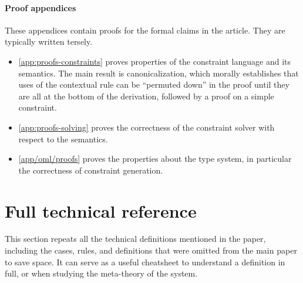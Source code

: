 \documentclass[acmsmall,screen,nonacm%
\Anonymous{,anonymous}{}%
\Final{}{,review}%
]{acmart}
\begin{document}
\paragraph{Proof appendices} These appendices contain proofs for the
formal claims in the article. They are typically written tersely.
\begin{itemize}
\item \cref{app:proofs-constraints} proves properties of the
  constraint language and its semantics. The main result is
  canonicalization, which morally establishes that uses of the
  contextual rule  can be ``permuted down'' in the
  proof until they are all at the bottom of the derivation, followed
  by a proof on a simple constraint.
\item \cref{app:proofs-solving} proves the correctness of the
  constraint solver with respect to the semantics.
\item \cref{app/oml/proofs} proves the properties about the \OML
  type system, in particular the correctness of constraint generation.
\end{itemize}

\clearpage
\section{Full technical reference}
\label{appendix:figures}
\label{app:full-reference}

This section repeats all the technical definitions mentioned in the paper,
including the cases, rules, and definitions that were omitted from the main
paper to save space. It can serve as a useful cheatsheet to understand a
definition in full, or when studying the meta-theory of the system.
\end{document}
